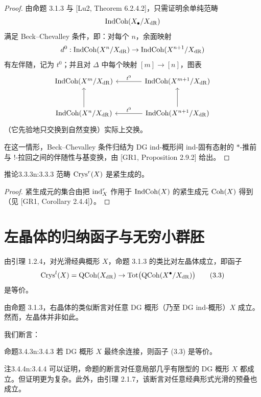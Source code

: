\begin{proof}
由命题 3.1.3 与 [Lu2, Theorem 6.2.4.2]，只需证明余单纯范畴
\[
\mathrm{IndCoh}(X_\bullet/X_{\mathrm{dR}})
\]
满足 Beck--Chevalley 条件，即：对每个 $n$，余面映射
\[
d^0:\mathrm{IndCoh}(X^n/X_{\mathrm{dR}})\to\mathrm{IndCoh}(X^{n+1}/X_{\mathrm{dR}})
\]
有左伴随，记为 $t^0$；并且对 $\Delta$ 中每个映射 $[m]\to[n]$，图表
\[
\begin{tikzcd}[column sep=large, row sep=large]
 \IndCoh(X^m/X_{\dR}) & \IndCoh(X^{m+1}/X_{\dR}) \arrow[l, "t^0"'] \\
 \IndCoh(X^n/X_{\dR}) \arrow[u] & \IndCoh(X^{n+1}/X_{\dR}) \arrow[l, "t^0"'] \arrow[u]
\end{tikzcd}
\]
（它先验地只交换到自然变换）实际上交换。

在这一情形，Beck--Chevalley 条件归结为 DG ind-概形间 ind-固有态射的 $*$-推前与 $!$-拉回之间的伴随性与基变换，由 [GR1, Proposition 2.9.2] 给出。
\end{proof}

\begin{othm}{推论}{3.3.3}{n:3.3.3}
范畴 $\mathrm{Crys}^r(X)$ 是紧生成的。
\end{othm}

\begin{proof}
紧生成元的集合由把 $\mathrm{ind}^r_X$ 作用于 $\mathrm{IndCoh}(X)$ 的紧生成元 $\mathrm{Coh}(X)$ 得到（见 [GR1, Corollary 2.4.4]）。
\end{proof}

\section{左晶体的归纳函子与无穷小群胚}

由引理 1.2.4，对光滑经典概形 $X$，命题 3.1.3 的类比对左晶体成立，即函子
\begin{equation}
\mathrm{Crys}^l(X)=\mathrm{QCoh}(X_{\mathrm{dR}})\to\mathrm{Tot}\big(\mathrm{QCoh}(X^\bullet/X_{\mathrm{dR}})\big)\tag{3.3}
\end{equation}
是等价。

由命题 3.1.3，右晶体的类似断言对任意 DG 概形（乃至 DG ind-概形）$X$ 成立。然而，左晶体并非如此。

我们断言：

\begin{othm}{命题}{3.4.3}{n:3.4.3}
若 DG 概形 $X$ 最终余连接，则函子 (3.3) 是等价。
\end{othm}

\begin{othm}{注}{3.4.4}{n:3.4.4}
可以证明，命题的断言对任意局部几乎有限型的 DG 概形 $X$ 都成立。但证明更为复杂。此外，由引理 2.1.7，该断言对任意经典形式光滑的预叠也成立。
\end{othm}

